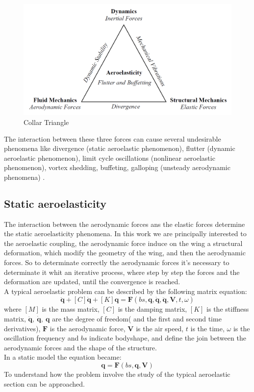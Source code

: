 \begin{figure}[H]
\centering
\includegraphics[width = .43\textwidth]{./Immagini/1_1.png}
\caption{Collar Triangle}
\label{fig:1_2}
\end{figure}
The interaction between these three forces can cause several undesirable phenomena like
divergence (static aeroelastic phenomenon), 
flutter (dynamic aeroelastic phenomenon), 
limit cycle oscillations (nonlinear
aeroelastic phenomenon), 
vortex shedding, buffeting, galloping
(unsteady aerodynamic phenomena) .
\subsection{Static aeroelasticity}
The interaction between the aerodynamic forces ans the elastic forces determine the static aeroelasticity phenomena. In this work we are principally interested to the aeroelastic coupling, the aerodynamic force induce on the wing a structural deformation, which modify the geometry of the wing, and then the aerodynamic forces. So to determinate correctly the aerodynamic forces it's necessary to determinate it whit an iterative process, where step by step the forces and the deformation are updated, until the convergence is reached.\\
A typical aeroelastic problem can be described by the following matrix equation:
\begin{equation*}
[M]\mathbf{\ddot{q}}+[C]\mathbf{\dot{q}}+[K]\mathbf{q}=\mathbf{F}(bs,\mathbf{q},\mathbf{\dot{q}},\mathbf{\ddot{q}},\mathbf{V},t,\omega)
\end{equation*}
where $[M]$ is the mass matrix, $[C]$ is the damping matrix, $[K]$ is the stiffness matrix, $\mathbf{\ddot{q}},\ \mathbf{\dot{q}},\ \mathbf{q}$ are the degree of freedom( and the first and second time derivatives), $\mathbf{\textbf{F}} $ is the aerodynamic force, $\mathbf{V}$ is the air speed, $t$ is the time, $\omega$ is the oscillation frequency and $bs$ indicate bodyshape, and define the join between the aerodynamic forces and the shape of the structure.\\
In a static model the equation became:
\begin{equation*}
[K]\mathbf{q}=\mathbf{F}(bs,\mathbf{q},\mathbf{V})
\end{equation*}
To understand how the problem involve the study of the typical aeroelastic section can be approached.
